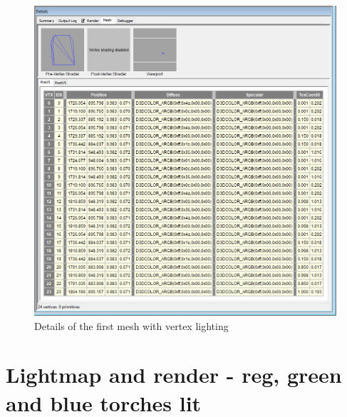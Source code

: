 \begin{appendix}
\begin{figure}[htbp]
	\centering
		\includegraphics[width=1.00\textwidth]{img/PIX/vertex_lit_mesh_details.png}
	\caption[Details of the first mesh with vertex lighting]{Details of the first mesh with vertex lighting}
	\label{fig:DetailsForFirstVertexLitMesh}
\end{figure}



 


\clearpage
\label{lab:RenderedFramesAndLightmaps}
\section{Lightmap and render - reg, green and blue torches lit} 
\label{lab:RGB}


\end{appendix}
